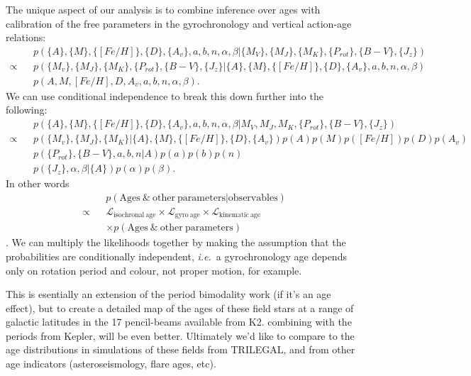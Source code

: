\documentclass[12pt]{article}
\newcommand{\ie}{{\it i.e.}}
\newcommand{\feh}{$[Fe/H]$}
\newcommand{\teff}{$T_{\mathrm{eff}}$}
\begin{document}
The unique aspect of our analysis is to combine inference over ages with
calibration of the free parameters in the gyrochronology and vertical
action-age relations:
\begin{eqnarray}
    &&p(\{A\}, \{M\}, \{[Fe/H]\}, \{D\}, \{A_v\}, a, b, n, \alpha, \beta|
    \{M_V\}, \{M_J\}, \{M_K\}, \{P_{rot}\}, \{B-V\}, \{J_z\}) \\ \nonumber
    \propto &&p(\{M_v\}, \{M_J\}, \{M_K\}, \{P_{rot}\},
    \{B-V\}, \{J_z\} | \{A\}, \{M\}, \{[Fe/H]\}, \{D\}, \{A_v\}, a, b, n,
    \alpha, \beta) \\ \nonumber
    &&p(A, M, [Fe/H], D, A_v, a, b, n, \alpha, \beta).
\end{eqnarray}
We can use conditional independence to break this down further into the
following:
\begin{eqnarray}
    &&p(\{A\}, \{M\}, \{[Fe/H]\}, \{D\}, \{A_v\}, a, b, n, \alpha, \beta|
    M_V, M_J, M_K,
    \{P_{rot}\}, \{B-V\}, \{J_z\}) \\  \nonumber
    \propto &&p(\{M_v\}, \{M_J\}, \{M_K\} | \{A\}, \{M\}, \{[Fe/H]\}, \{D\},
    \{A_v\})
    p(A)p(M)p([Fe/H])p(D)p(A_v) \\ \nonumber
    &&p(\{P_{rot}\}, \{B-V\}, a, b, n | A)p(a)p(b)p(n) \\ \nonumber
    &&p(\{J_z\}, \alpha, \beta | \{A\}) p(\alpha)p(\beta).
\end{eqnarray}
In other words
\begin{eqnarray}
    &&p(\mathrm{Ages~\&~other~parameters}|\mathrm{observables}) \\
    \propto &&\mathcal{L}_{\mathrm{isochronal~age}} \times
    \mathcal{L}_{\mathrm{gyro~age}} \times
    \mathcal{L}_{\mathrm{kinematic~age}} \\
    && \times p(\mathrm{Ages~\&~other~parameters})
\end{eqnarray}.
We can multiply the likelihoods together by making the assumption that the
probabilities are conditionally independent, \ie\ a gyrochronology age depends
only on rotation period and colour, not proper motion, for example.

This is esentially an extension of the period bimodality work (if it's an age
effect), but to create a detailed map of the ages of these field stars at a
range of galactic latitudes in the 17 pencil-beams available from K2.
combining with the periods from Kepler, will be even better.
Ultimately we'd like to compare to the age distributions in simulations of
these fields from TRILEGAL, and from other age indicators (asteroseismology,
flare ages, etc).
\end{document}
